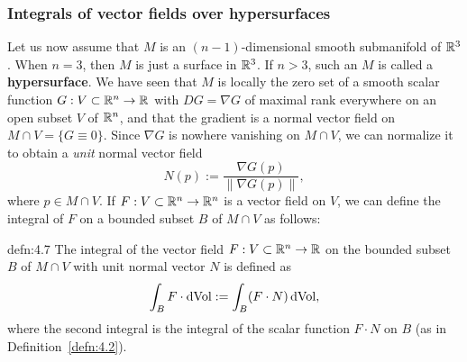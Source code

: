 \subsubsection{Integrals of vector fields over hypersurfaces} \label{subsubsec:4.2.2}
Let us now assume that $M$ is an $(n-1)$-dimensional smooth submanifold of $\mathbb{R}^3$. 
When $n = 3$, then $M$ is just a surface in $\mathbb{R}^3$. If $n > 3$, such an $M$ 
is called a {\bf hypersurface}. We have seen that $M$ is locally the zero 
set of a smooth scalar function $G : V \subset \mathbb{R}^n \to \mathbb{R}$ with $DG = 
\nabla G$ of maximal rank everywhere on an open subset $V$ of $\mathbb{R}^n$, and 
that the gradient is a normal vector field on $M \cap V = \{G \equiv 0\}$. 
Since $\nabla G$ is nowhere vanishing on $M \cap V$, we can normalize it to 
obtain a \emph{unit} normal vector field 
\[ N(p) := \frac{\nabla G(p)}{\|\nabla G(p)\|}, \] 
where $p \in M \cap V$. If $F : V \subset \mathbb{R}^n \to \mathbb{R}^n$ is a vector field on $V$, 
we can define the integral of $F$ on a bounded subset $B$ of $M \cap V$ as follows: 

\begin{defn}{defn:4.7}
    The integral of the vector field $F : V \subset \mathbb{R}^n \to \mathbb{R}$ on the 
    bounded subset $B$ of $M \cap V$ with unit normal vector $N$ is defined as 
    \[ \int_B F \cdot \operatorname{dVol} := \int_B (F \cdot N) \operatorname{dVol}, \] 
    where the second integral is the integral of the scalar function 
    $F \cdot N$ on $B$ (as in Definition~\ref{defn:4.2}).
\end{defn}\vspace{-0.25cm}

